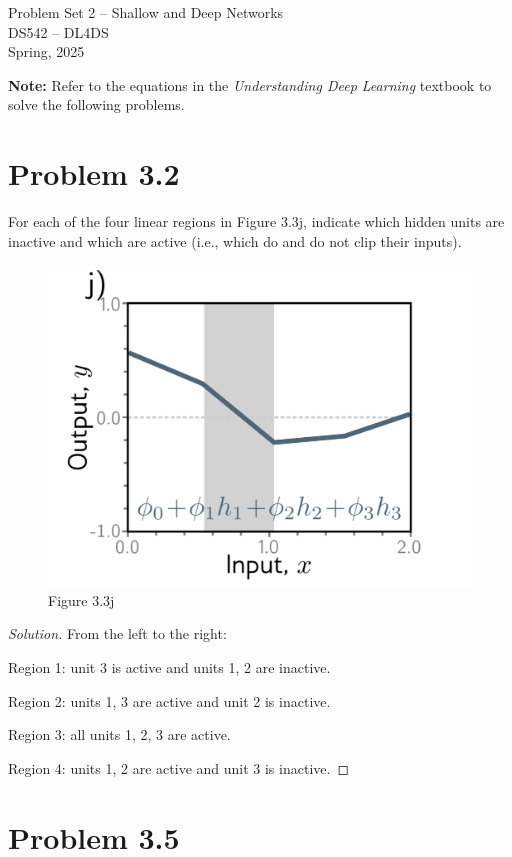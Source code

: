 \documentclass[10pt]{article}
\begin{document}
\begin{center}
    \LARGE {Problem Set 2 – Shallow and Deep Networks} \\[1em]
    \Large{DS542 – DL4DS} \\[0.5em]
    \large Spring, 2025
\end{center}

\vspace{2em}

\noindent\textbf{Note:} Refer to the equations in the \textit{Understanding Deep Learning} textbook to solve the following problems.

\vspace{2em}

\section*{Problem 3.2}
For each of the four linear regions in Figure 3.3j, indicate which hidden units are inactive and which are active (i.e., which do and do not clip their inputs).

\begin{figure}[h]
    \centering
    \includegraphics[width=0.5\linewidth]{fig-3.3j.png}
    \caption{Figure 3.3j}
    \label{fig:enter-label}
\end{figure}

\begin{proof}[Solution]
    From the left to the right: 
    
    Region 1: unit 3 is active and units 1, 2 are inactive. 

    Region 2: units 1, 3 are active and unit 2 is inactive. 

    Region 3: all units 1, 2, 3 are active. 

    Region 4: units 1, 2 are active and unit 3 is inactive. 
\end{proof}


\vspace{2em}

\section*{Problem 3.5}
\end{document}

